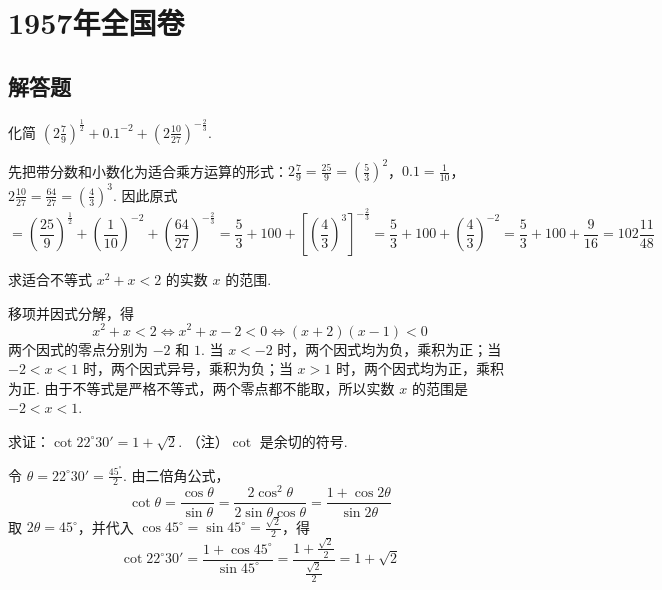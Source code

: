 \chapter{1957年全国卷}

\section{解答题}

\begin{problem}
化简 \(\left(2\frac{7}{9}\right)^{\frac{1}{2}}+0.1^{-2}+\left(2\frac{10}{27}\right)^{-\frac{2}{3}}\).
\end{problem}

\begin{solution}
先把带分数和小数化为适合乘方运算的形式：\(2\frac{7}{9}=\frac{25}{9}=\left(\frac{5}{3}\right)^2\)，\(0.1=\frac{1}{10}\)，\(2\frac{10}{27}=\frac{64}{27}=\left(\frac{4}{3}\right)^3\).
因此原式
\[
=\left(\frac{25}{9}\right)^{\frac{1}{2}}+\left(\frac{1}{10}\right)^{-2}+\left(\frac{64}{27}\right)^{-\frac{2}{3}}
=\frac{5}{3}+100+\left[\left(\frac{4}{3}\right)^3\right]^{-\frac{2}{3}}
=\frac{5}{3}+100+\left(\frac{4}{3}\right)^{-2}
=\frac{5}{3}+100+\frac{9}{16}
=102\frac{11}{48}
\]
\end{solution}

\begin{problem}
求适合不等式 \(x^{2}+x<2\) 的实数 \(x\) 的范围.
\end{problem}

\begin{solution}
移项并因式分解，得
\[
x^{2}+x<2\Longleftrightarrow x^{2}+x-2<0\Longleftrightarrow (x+2)(x-1)<0
\]
两个因式的零点分别为 \(-2\) 和 \(1\). 当 \(x<-2\) 时，两个因式均为负，乘积为正；当 \(-2<x<1\) 时，两个因式异号，乘积为负；当 \(x>1\) 时，两个因式均为正，乘积为正. 由于不等式是严格不等式，两个零点都不能取，所以实数 \(x\) 的范围是 \(-2<x<1\).
\end{solution}

\begin{problem}
求证：\(\cot22^{\circ}30'=1+\sqrt2\). （注）\(\cot\) 是余切的符号.
\end{problem}

\begin{solution}
令 \(\theta=22^{\circ}30'=\frac{45^{\circ}}{2}\). 由二倍角公式，
\[
\cot\theta=\frac{\cos\theta}{\sin\theta}=\frac{2\cos^2\theta}{2\sin\theta\cos\theta}=\frac{1+\cos2\theta}{\sin2\theta}
\]
取 \(2\theta=45^{\circ}\)，并代入 \(\cos45^{\circ}=\sin45^{\circ}=\frac{\sqrt2}{2}\)，得
\[
\cot22^{\circ}30'=\frac{1+\cos45^{\circ}}{\sin45^{\circ}}=\frac{1+\frac{\sqrt2}{2}}{\frac{\sqrt2}{2}}=1+\sqrt2
\]
\end{solution}

